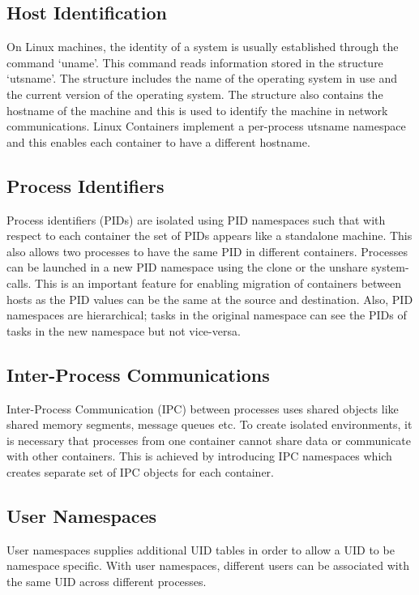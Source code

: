 \subsection{Host Identification}
On Linux machines, the identity of a system is usually established through the command `uname'. This command reads information stored in the structure `utsname'. The structure includes the name of the operating system in use and the current version of the operating system. The structure also contains the hostname of the machine and this is used to identify the machine in network communications. Linux Containers implement a per-process utsname namespace and this enables each container to have a different hostname.

\subsection{Process Identifiers}
Process identifiers (PIDs) are isolated using PID namespaces such that with respect to each container the set of PIDs appears like a standalone machine. This also allows two processes to  have the same PID in different containers. Processes can be launched in a new PID namespace using the clone or the unshare system-calls. This is an important feature for enabling migration of containers between hosts as the PID values can be the same at the source and destination. Also, PID namespaces are hierarchical; tasks in the original namespace can see the PIDs of tasks in the new namespace but not vice-versa.  

\subsection{Inter-Process Communications}
Inter-Process Communication (IPC) between processes uses shared objects like shared memory segments, message queues etc. To create isolated environments, it is necessary that processes from one container cannot share data or communicate with other containers. This is achieved by introducing IPC namespaces which creates separate set of IPC objects for each container.

\subsection{User Namespaces}
User namespaces supplies additional UID tables in order to allow a UID to be namespace specific.  With user namespaces, different users can be associated with the same UID across different processes.

